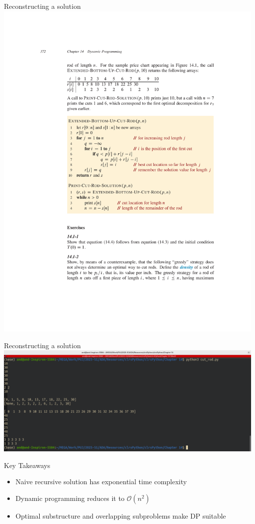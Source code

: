 \documentclass{beamer}
\begin{document}
\begin{frame}{Reconstructing a solution}
    \centering
    \includegraphics[width=\textwidth,clip=true,trim=5cm 13cm 3cm 9cm]{figures/p372}
\end{frame}

\begin{frame}{Reconstructing a solution}
    \centering
    \includegraphics[width=\textwidth]{figures/implementation}
\end{frame}

\begin{frame}{Key Takeaways}
    \begin{itemize}
        \item Naive recursive solution has exponential time complexity
        \item Dynamic programming reduces it to $\mathcal{O}(n^2)$
        \item Optimal substructure and overlapping subproblems make DP suitable
    \end{itemize}
\end{frame}
\end{document}
